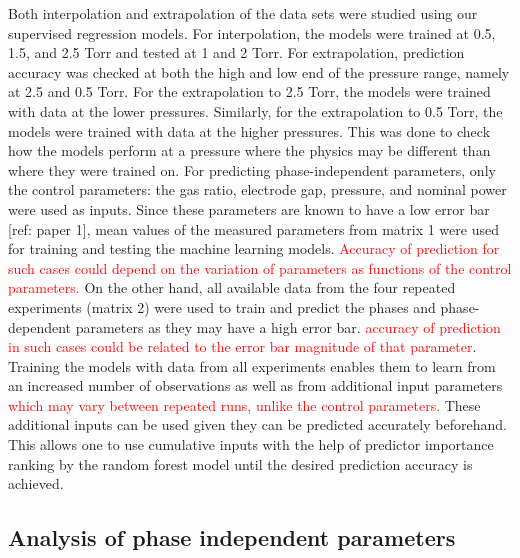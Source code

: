\documentclass[12pt]{iopart}
\begin{document}
Both interpolation and extrapolation of the data sets were studied using our supervised regression models. For interpolation, the models were trained at 0.5, 1.5, and 2.5 Torr and tested at 1 and 2 Torr. For extrapolation, prediction accuracy was checked at both the high and low end of the pressure range, namely at 2.5 and 0.5 Torr. For the extrapolation to 2.5 Torr, the models were trained with data at the lower pressures.  Similarly, for the extrapolation to 0.5 Torr, the models were trained with data at the higher pressures. This was done to check how the models perform at a pressure where the physics may be different than where they were trained on. For predicting phase-independent parameters, only the control parameters: the gas ratio, electrode gap, pressure, and nominal power were used as inputs. Since these parameters are known to have a low error bar [ref: paper 1], mean values of the measured parameters from matrix 1 were used for training and testing the machine learning models. \textcolor{red}{Accuracy of prediction for such cases could depend on the variation of parameters as functions of the control parameters.} On the other hand, all available data from the four repeated experiments (matrix 2) were used to train and predict the phases and phase-dependent parameters as they may have a high error bar. \textcolor{red}{accuracy of prediction in such cases could be related to the error bar magnitude of that parameter}. Training the models with data from all experiments enables them to learn from an increased number of observations as well as from additional input parameters \textcolor{red}{which may vary between repeated runs, unlike the control parameters.} These additional inputs can be used given they can be predicted accurately beforehand. This allows one to use cumulative inputs with the help of predictor importance ranking by the random forest model until the desired prediction accuracy is achieved.

\subsection{Analysis of phase independent parameters} 
\end{document}
